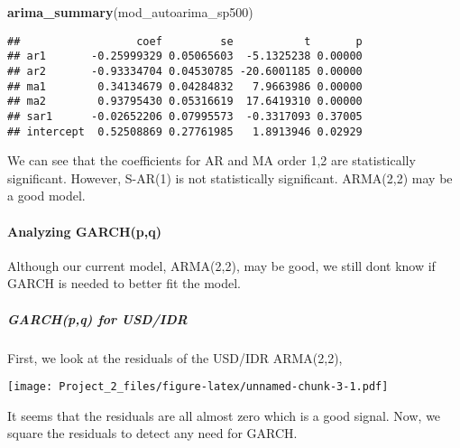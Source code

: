 \documentclass[]{article}
\newenvironment{Shaded}{\begin{snugshade}}{\end{snugshade}}
\newcommand{\KeywordTok}[1]{\textcolor[rgb]{0.13,0.29,0.53}{\textbf{#1}}}
\newcommand{\CommentTok}[1]{\textcolor[rgb]{0.56,0.35,0.01}{\textit{#1}}}
\newcommand{\OperatorTok}[1]{\textcolor[rgb]{0.81,0.36,0.00}{\textbf{#1}}}
\newcommand{\NormalTok}[1]{#1}
\let\oldparagraph\paragraph
\renewcommand{\paragraph}[1]{\oldparagraph{#1}\mbox{}}
\let\oldsubparagraph\subparagraph
\renewcommand{\subparagraph}[1]{\oldsubparagraph{#1}\mbox{}}
\begin{document}
\begin{Shaded}
\begin{Highlighting}[]
\KeywordTok{arima_summary}\NormalTok{(mod_autoarima_sp500)}
\end{Highlighting}
\end{Shaded}

\begin{verbatim}
##                  coef         se           t       p
## ar1       -0.25999329 0.05065603  -5.1325238 0.00000
## ar2       -0.93334704 0.04530785 -20.6001185 0.00000
## ma1        0.34134679 0.04284832   7.9663986 0.00000
## ma2        0.93795430 0.05316619  17.6419310 0.00000
## sar1      -0.02652206 0.07995573  -0.3317093 0.37005
## intercept  0.52508869 0.27761985   1.8913946 0.02929
\end{verbatim}

We can see that the coefficients for AR and MA order 1,2 are
statistically significant. However, S-AR(1) is not statistically
significant. ARMA(2,2) may be a good model.

\paragraph{Analyzing GARCH(p,q)}\label{analyzing-garchpq}

Although our current model, ARMA(2,2), may be good, we still dont know
if GARCH is needed to better fit the model.

\subparagraph{GARCH(p,q) for USD/IDR}\label{garchpq-for-usdidr}

First, we look at the residuals of the USD/IDR ARMA(2,2),

\begin{Shaded}
\end{Shaded}

\texttt{[image: Project\_2\_files/figure-latex/unnamed-chunk-3-1.pdf]}

It seems that the residuals are all almost zero which is a good signal.
Now, we square the residuals to detect any need for GARCH.

\begin{Shaded}
\end{Shaded}
\end{document}
